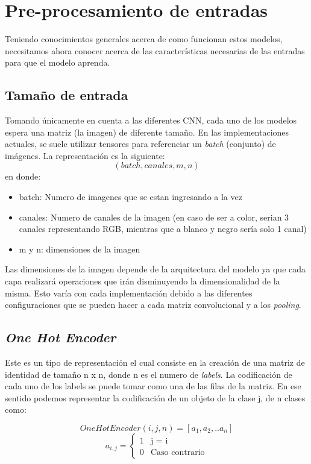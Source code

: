 \section{Pre-procesamiento de entradas}
Teniendo conocimientos generales acerca de como funcionan estos modelos, necesitamos ahora conocer acerca de las características necesarias de las entradas para que el modelo aprenda.

\subsection{Tamaño de entrada}
Tomando únicamente en cuenta a las diferentes CNN, cada uno de los modelos espera una matriz (la imagen) de diferente tamaño. En las implementaciones actuales, se suele utilizar tensores para referenciar un \textit{batch} (conjunto) de imágenes. La representación es la siguiente:
$$(batch,canales, m,n)$$
en donde:
\begin{itemize}
    \item batch: Numero de imagenes que se estan ingresando a la vez
    \item canales: Numero de canales de la imagen (en caso de ser a color, serian 3 canales representando RGB, mientras que a blanco y negro sería solo 1 canal)
    \item m y n: dimensiones de la imagen
\end{itemize}

Las dimensiones de la imagen depende de la arquitectura del modelo ya que cada capa realizará operaciones que irán disminuyendo la dimensionalidad de la misma. Esto varía con cada implementación debido a las diferentes configuraciones que se pueden hacer a cada matriz convolucional y a los \textit{pooling}.


\subsection {\textit{One Hot Encoder}}
 Este es un tipo de representación el cual consiste en la creación de una matriz de identidad de tamaño n x n, donde n es el numero de \textit{labels}. La codificación de cada uno de los labels se puede tomar como una de las filas de la matriz. En ese sentido podemos representar la codificación de un objeto de la clase j, de n clases como:

$$OneHotEncoder(i,j,n)= [a_1,a_2, .. a_n] $$
\begin{equation*}
a_{i,j}=
\begin{cases}
1 & \text{j = i}\\
0 &  \text{Caso contrario}
\end{cases}
\end{equation*}

